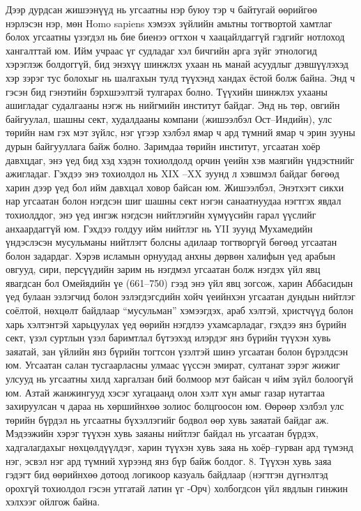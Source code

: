 Дээр дурдсан жишээнүүд нь угсаатны нэр буюу тэр ч байтугай өөрийгөө нэрлэсэн нэр, мөн Homo sapiens хэмээх зүйлийн амьтны тогтвортой хамтлаг болох угсаатны үзэгдэл нь бие биенээ огтхон ч хаацайлдаггүй гэдгийг нотлоход хангалттай юм. Ийм учраас үг судладаг хэл бичгийн арга зүйг этнологид хэрэглэж болдоггүй, бид энэхүү шинжлэх ухаан нь манай асуудлыг дэвшүүлэхэд хэр зэрэг тус болохыг нь шалгахын тулд түүхэнд хандах ёстой болж байна. Энд ч гэсэн бид гэнэтийн бэрхшээлтэй тулгарах болно. Түүхийн шинжлэх ухааны ашигладаг судалгааны нэгж нь нийгмийн институт байдаг. Энд нь төр, овгийн байгуулал, шашны сект, худалдааны компани (жишээлбэл Ост–Индийн), улс төрийн нам гэх мэт зүйлс, нэг үгээр хэлбэл ямар ч ард түмний ямар ч эрин зууны дурын байгууллага байж болно. Заримдаа төрийн институт, угсаатан хоёр давхцдаг, энэ үед бид хэд хэдэн тохиолдолд орчин үеийн хэв маягийн үндэстнийг ажигладаг. Гэхдээ энэ тохиолдол нь XIX –XX зуунд л хэвшмэл байдаг бөгөөд харин дээр үед бол ийм давхцал ховор байсан юм. Жишээлбэл, Энэтхэгт сикхи нар угсаатан болон нэгдсэн шиг шашны сект нэгэн санаатнуудаа нэгтгэх явдал тохиолддог, энэ үед ингэж нэгдсэн нийтлэгийн хүмүүсийн гарал үүслийг анхаардаггүй юм. Гэхдээ голдуу ийм нийтлэг нь YII зуунд Мухамедийн үндэслэсэн мусульманы нийтлэгт болсны адилаар тогтворгүй бөгөөд угсаатан болон задардаг. Хэрэв исламын орнуудад анхны дөрвөн халифын үед арабын овгууд, сири, персүүдийн зарим нь нэгдмэл угсаатан болж нэгдэх үйл явц явагдсан бол Омейядийн үе (661–750) гээд энэ үйл явц зогсож, харин Аббасидын үед булаан эзлэгчид болон эзлэгдэгсдийн хойч үеийнхэн угсаатан дундын нийтлэг соёлтой, нөхцөлт байдлаар “мусульман” хэмээгдэх, араб хэлтэй, христчүүд болон харь хэлтэнтэй харьцуулах үед өөрийн нэгдлээ ухамсарладаг, гэхдээ янз бүрийн сект, үзэл суртлын үзэл баримтлал бүтээхэд илэрдэг янз бүрийн түүхэн хувь заяатай, зан үйлийн янз бүрийн тогтсон үзэлтэй шинэ угсаатан болон бүрэлдсэн юм.
Угсаатан салан тусгаарласны улмаас үүссэн эмират, султанат зэрэг жижиг улсууд нь угсаатны хилд харгалзан бий болмоор мэт байсан ч ийм зүйл болоогүй юм. Азтай жанжингууд хэсэг хугацаанд олон хэлт хүн амыг газар нутагтаа захируулсан ч дараа нь хөршийнхөө золиос болцгоосон юм. Өөрөөр хэлбэл улс төрийн бүрдэл нь угсаатны бүхэллэгийг бодвол өөр хувь заяатай байдаг аж. Мэдээжийн хэрэг түүхэн хувь заяаны нийтлэг байдал нь угсаатан бүрдэх, хадгалагдахыг нөхцөлдүүлдэг, харин түүхэн хувь заяа нь хоёр–гурван ард түмэнд нэг, эсвэл нэг ард түмний хүрээнд янз бүр байж болдог.
8. Түүхэн хувь заяа гэдэгт бид өөрийнхөө дотоод логикоор казуаль байдлаар (нэгтгэн дүгнэлтэд орохгүй тохиолдол гэсэн утгатай латин үг -Орч) холбогдсон үйл явдлын гинжин хэлхээг ойлгож байна.
